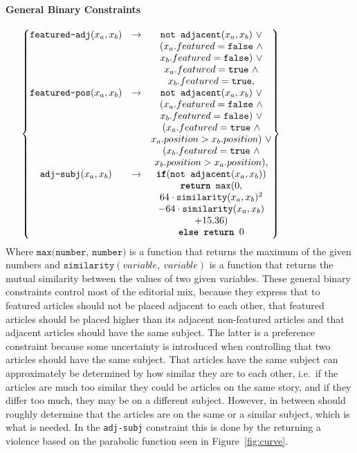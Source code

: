\paragraph{General Binary Constraints}
\begin{align}
\hspace{-60pt}
	\begin{Bmatrix}
		\texttt{featured-adj}(x_a, x_b) &\rightarrow& \texttt{not adjacent}(x_a,x_b)\ \vee\\
			&&(x_a.featured = \texttt{false}\ \wedge\\
			&&x_b.featured = \texttt{false})\ \vee\\
			&&x_a.featured = \texttt{true}\ \wedge\\
			&&x_b.featured = \texttt{true},\\
		\texttt{featured-pos}(x_a, x_b) &\rightarrow& \texttt{not adjacent}(x_a,x_b)\ \vee\\
			&&(x_a.featured = \texttt{false}\ \wedge\\
			&&x_b.featured = \texttt{false})\ \vee\\
			&&(x_a.featured = \texttt{true}\ \wedge\\
			&&x_a.position > x_b.position)\ \vee\\
			&&(x_b.featured = \texttt{true}\ \wedge\\
			&&x_b.position > x_a.position),\\
		\texttt{adj-subj}(x_a, x_b) &\rightarrow& \texttt{\textbf{if}}(\texttt{not adjacent}(x_a,x_b))\\
			&&\texttt{\textbf{return} max}(0,\\
			&&64 \cdot \texttt{similarity}(x_a,x_b)^2\\
			&& - 64 \cdot \texttt{similarity}(x_a,x_b)\\
			&& + 15.36)\\
			&&\texttt{\textbf{else return }}0
	\end{Bmatrix}
\end{align}
Where $\texttt{max(number,\ number)}$ is a function that returns the maximum of the given numbers and $\texttt{similarity}(variable,\ variable)$ is a function that returns the mutual similarity between the values of two given variables. These general binary constraints control most of the editorial mix, because they express that to featured articles should not be placed adjacent to each other, that featured articles should be placed higher than its adjacent non-featured articles and that adjacent articles should have the same subject. The latter is a preference constraint because some uncertainty is introduced when controlling that two articles should have the same subject. That articles have the same subject can approximately be determined by how similar they are to each other, i.e.\ if the articles are much too similar they could be articles on the same story, and if they differ too much, they may be on a different subject. However, in between should roughly determine that the articles are on the same or a similar subject, which is what is needed. In the \texttt{adj-subj} constraint this is done by the returning a violence based on the parabolic function seen in Figure~\ref{fig:curve}.
